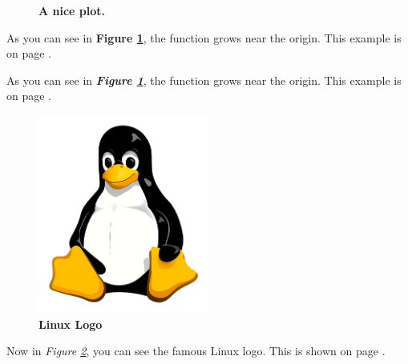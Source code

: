 \documentclass[12pt, letterpaper]{article}
\begin{document}
\begin{figure}[ht]   %
    \centering   %



    \caption{\textbf{A nice plot.}}   
    \label{fig:mesh1}   %
\end{figure}


As you can see in \textbf{Figure \ref{fig:mesh1}}, the function grows near the origin. This example is on page \pageref{fig:mesh1}.


As you can see in \textbf{\textit{Figure \ref{fig:mesh1}}}, the function grows near the origin. This example is on page \pageref{fig:mesh1}.



\begin{figure}[htbp]
	\centering
	\includegraphics[width=0.5\textwidth]{linux_logo.png}
	\caption{\textbf{Linux Logo}}
	\label{fig:linuxlogo}
\end{figure}

Now in \textit{Figure \ref{fig:linuxlogo}}, you can see the famous Linux logo.
This is shown on page \pageref{fig:linuxlogo}.
\end{document}
